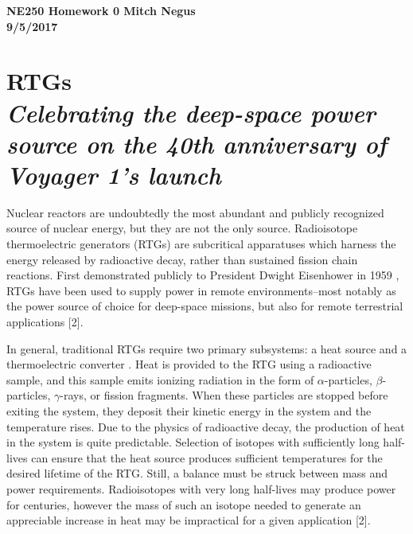 \documentclass{article}
\newcommand{\tab}{\-\hspace{1cm}}
\begin{document}
\thispagestyle{empty}

{\bf {\large {NE250 Homework {0} \hfill Mitch Negus\\
		\hspace*{\fill} 9/5/2017\\ }}}
\section*{RTGs\\\textit{\normalsize Celebrating the deep-space power source on the 40th anniversary of Voyager 1's launch}}

\begin{multicols}{2}

\tab Nuclear reactors are undoubtedly the most abundant and publicly recognized source of nuclear energy, but they are not the only source. Radioisotope thermoelectric generators (RTGs) are subcritical apparatuses which harness the energy released by radioactive decay, rather than sustained fission chain reactions. First demonstrated publicly to President Dwight Eisenhower in 1959 \cite{rowe}, RTGs have been used to supply power in remote environments--most notably as the power source of choice for deep-space missions, but also for remote terrestrial applications [2]. 

\tab In general, traditional RTGs require two primary subsystems: a heat source and a thermoelectric converter \cite{rowe,lange}. Heat is provided to the RTG using a radioactive sample, and this sample emits ionizing radiation in the form of $\alpha$-particles, $\beta$-particles, $\gamma$-rays, or fission fragments. When these particles are stopped before exiting the system, they deposit their kinetic energy in the system and the temperature rises. Due to the physics of radioactive decay, the production of heat in the system is quite predictable. Selection of isotopes with sufficiently long half-lives can ensure that the heat source produces sufficient temperatures for the desired lifetime of the RTG. Still, a balance must be struck between mass and power requirements. Radioisotopes with very long half-lives may produce power for centuries, however the mass of such an isotope needed to generate an appreciable increase in heat may be impractical for a given application [2].


\end{multicols}
\end{document}
